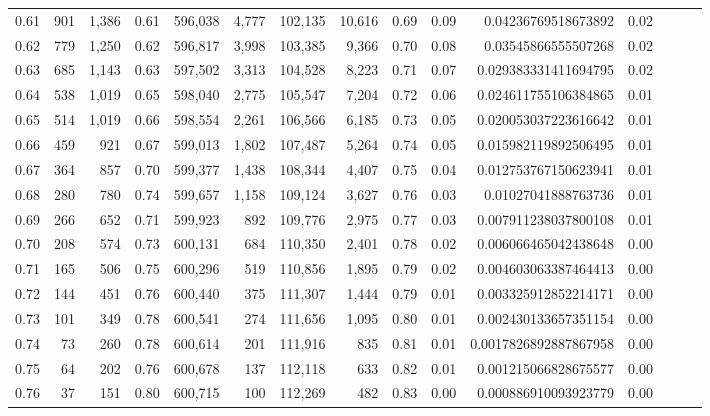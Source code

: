 \begin{tabular}{rrrrrrrrrrrrrrr}
0.61 &     901 &  1,386 &  0.61 &  596,038 &    4,777 &  102,135 &   10,616 &  0.69 &  0.09 &     0.04236769518673892 &      0.02 \\
0.62 &     779 &  1,250 &  0.62 &  596,817 &    3,998 &  103,385 &    9,366 &  0.70 &  0.08 &     0.03545866555507268 &      0.02 \\
0.63 &     685 &  1,143 &  0.63 &  597,502 &    3,313 &  104,528 &    8,223 &  0.71 &  0.07 &    0.029383331411694795 &      0.02 \\
0.64 &     538 &  1,019 &  0.65 &  598,040 &    2,775 &  105,547 &    7,204 &  0.72 &  0.06 &    0.024611755106384865 &      0.01 \\
0.65 &     514 &  1,019 &  0.66 &  598,554 &    2,261 &  106,566 &    6,185 &  0.73 &  0.05 &    0.020053037223616642 &      0.01 \\
0.66 &     459 &    921 &  0.67 &  599,013 &    1,802 &  107,487 &    5,264 &  0.74 &  0.05 &    0.015982119892506495 &      0.01 \\
0.67 &     364 &    857 &  0.70 &  599,377 &    1,438 &  108,344 &    4,407 &  0.75 &  0.04 &    0.012753767150623941 &      0.01 \\
0.68 &     280 &    780 &  0.74 &  599,657 &    1,158 &  109,124 &    3,627 &  0.76 &  0.03 &     0.01027041888763736 &      0.01 \\
0.69 &     266 &    652 &  0.71 &  599,923 &      892 &  109,776 &    2,975 &  0.77 &  0.03 &    0.007911238037800108 &      0.01 \\
0.70 &     208 &    574 &  0.73 &  600,131 &      684 &  110,350 &    2,401 &  0.78 &  0.02 &    0.006066465042438648 &      0.00 \\
0.71 &     165 &    506 &  0.75 &  600,296 &      519 &  110,856 &    1,895 &  0.79 &  0.02 &    0.004603063387464413 &      0.00 \\
0.72 &     144 &    451 &  0.76 &  600,440 &      375 &  111,307 &    1,444 &  0.79 &  0.01 &    0.003325912852214171 &      0.00 \\
0.73 &     101 &    349 &  0.78 &  600,541 &      274 &  111,656 &    1,095 &  0.80 &  0.01 &    0.002430133657351154 &      0.00 \\
0.74 &      73 &    260 &  0.78 &  600,614 &      201 &  111,916 &      835 &  0.81 &  0.01 &   0.0017826892887867958 &      0.00 \\
0.75 &      64 &    202 &  0.76 &  600,678 &      137 &  112,118 &      633 &  0.82 &  0.01 &    0.001215066828675577 &      0.00 \\
0.76 &      37 &    151 &  0.80 &  600,715 &      100 &  112,269 &      482 &  0.83 &  0.00 &    0.000886910093923779 &      0.00 \\

\end{tabular}
